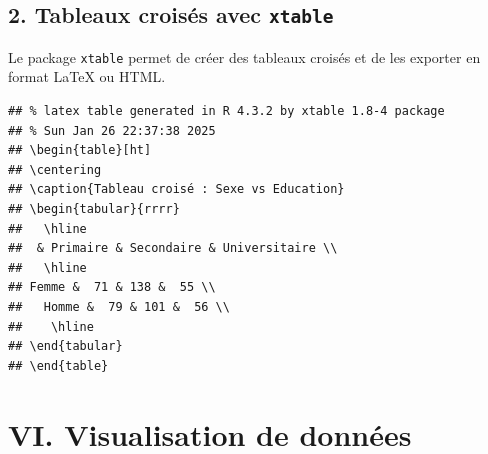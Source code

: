 \documentclass[
]{article}
\newenvironment{Shaded}{\begin{snugshade}}{\end{snugshade}}
\newcommand{\AttributeTok}[1]{\textcolor[rgb]{0.13,0.29,0.53}{#1}}
\newcommand{\CommentTok}[1]{\textcolor[rgb]{0.56,0.35,0.01}{\textit{#1}}}
\newcommand{\ConstantTok}[1]{\textcolor[rgb]{0.56,0.35,0.01}{#1}}
\newcommand{\FunctionTok}[1]{\textcolor[rgb]{0.13,0.29,0.53}{\textbf{#1}}}
\newcommand{\NormalTok}[1]{#1}
\newcommand{\OtherTok}[1]{\textcolor[rgb]{0.56,0.35,0.01}{#1}}
\newcommand{\SpecialCharTok}[1]{\textcolor[rgb]{0.81,0.36,0.00}{\textbf{#1}}}
\newcommand{\StringTok}[1]{\textcolor[rgb]{0.31,0.60,0.02}{#1}}
\begin{document}
\hypertarget{tableaux-croisuxe9s-avec-xtable}{%
\subsection{\texorpdfstring{2. Tableaux croisés avec
\texttt{xtable}}{2. Tableaux croisés avec xtable}}\label{tableaux-croisuxe9s-avec-xtable}}

Le package \texttt{xtable} permet de créer des tableaux croisés et de
les exporter en format LaTeX ou HTML.

\begin{Shaded}
\end{Shaded}

\begin{verbatim}
## % latex table generated in R 4.3.2 by xtable 1.8-4 package
## % Sun Jan 26 22:37:38 2025
## \begin{table}[ht]
## \centering
## \caption{Tableau croisé : Sexe vs Education} 
## \begin{tabular}{rrrr}
##   \hline
##  & Primaire & Secondaire & Universitaire \\ 
##   \hline
## Femme &  71 & 138 &  55 \\ 
##   Homme &  79 & 101 &  56 \\ 
##    \hline
## \end{tabular}
## \end{table}
\end{verbatim}

\hypertarget{vi.-visualisation-de-donnuxe9es}{%
\section{VI. Visualisation de
données}\label{vi.-visualisation-de-donnuxe9es}}
\end{document}
